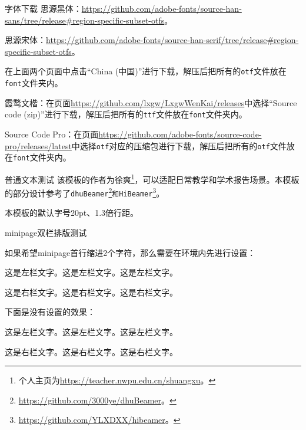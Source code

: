 \begin{frame}[fragile]{字体下载}
思源黑体：\url{https://github.com/adobe-fonts/source-han-sans/tree/release#region-specific-subset-otfs}。

\textrm{思源宋体}：\url{https://github.com/adobe-fonts/source-han-serif/tree/release#region-specific-subset-otfs}。

在上面两个页面中点击``China (中国)''进行下载，解压后把所有的\texttt{otf}文件放在\texttt{font}文件夹内。

霞鹜文楷：在页面\url{https://github.com/lxgw/LxgwWenKai/releases}中选择``Source code
(zip)''进行下载，解压后把所有的\texttt{ttf}文件放在\texttt{font}文件夹内。

Source Code Pro：在页面\url{https://github.com/adobe-fonts/source-code-pro/releases/latest}中选择\texttt{otf}对应的压缩包进行下载，解压后把所有的\texttt{otf}文件放在\texttt{font}文件夹内。
\end{frame}

\begin{frame}{普通文本测试}
    该模板的作者为徐爽\footnote{个人主页为\url{https://teacher.nwpu.edu.cn/shuangxu}。}，可以适配日常教学和学术报告场景。本模板的部分设计参考了\texttt{dhuBeamer}\footnote{\url{https://github.com/3000ye/dhuBeamer}。}\texttt{和HiBeamer}\footnote{\url{https://github.com/YLXDXX/hibeamer}。}。

    本模板的默认字号20pt、1.3倍行距。

\end{frame}

\begin{frame}{minipage双栏排版测试}

如果希望minipage首行缩进2个字符，那么需要在环境内先进行设置\texttt{\setlength{\parindent}{2em}}：


\begin{minipage}{0.48\textwidth}
    \setlength{\parindent}{2em}
    这是左栏文字。这是左栏文字。这是左栏文字。
\end{minipage}
\hfill
\begin{minipage}{0.48\textwidth}
    \setlength{\parindent}{2em}
    这是右栏文字。这是右栏文字。这是右栏文字。
\end{minipage}


下面是没有设置的效果：


\begin{minipage}{0.48\textwidth}
    这是左栏文字。这是左栏文字。这是左栏文字。
\end{minipage}
\hfill
\begin{minipage}{0.48\textwidth}
    这是右栏文字。这是右栏文字。这是右栏文字。
\end{minipage}

\end{frame}

